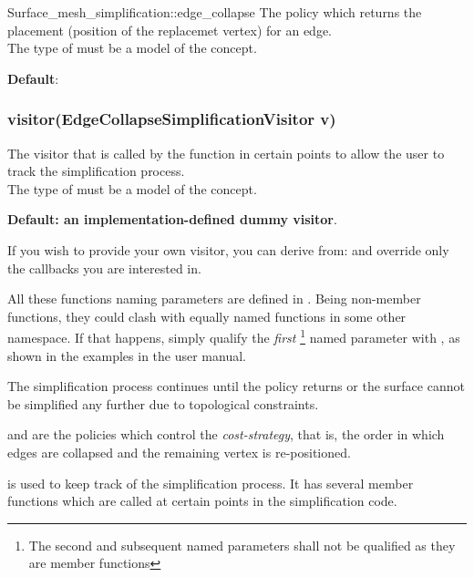 \begin{ccRefFunction}{Surface_mesh_simplification::edge_collapse}
The policy which returns the placement (position of the replacemet vertex)
for an edge.\\
The type of  must be a model of the  concept.

\textbf{Default}: 

\subsubsection*{visitor(EdgeCollapseSimplificationVisitor v)}

The visitor that is called by the  function
in certain points to allow the user to track the simplification process.\\
The type of  must be a model of the  concept.

\textbf{Default: an implementation-defined dummy visitor}.

If you wish to provide your own visitor, you can derive from:
and override only the callbacks you are interested in.




All these functions naming parameters are defined in
. Being non-member functions, they could clash
with equally named functions in some other namespace. If that happens,
simply qualify the {\em first} 
\footnote{The second and subsequent named parameters shall not be qualified as they are member functions}
named parameter with , as shown in the examples in the user manual.


The simplification process continues until the  policy returns 
or the surface cannot be simplified any further due to topological constraints.

 and  are the policies which control
the {\em cost-strategy}, that is, the order in which edges are collapsed 
and the remaining vertex is re-positioned.

 is used to keep track of the simplification process. It has several member functions which
are called at certain points in the simplification code.

\end{ccRefFunction}



